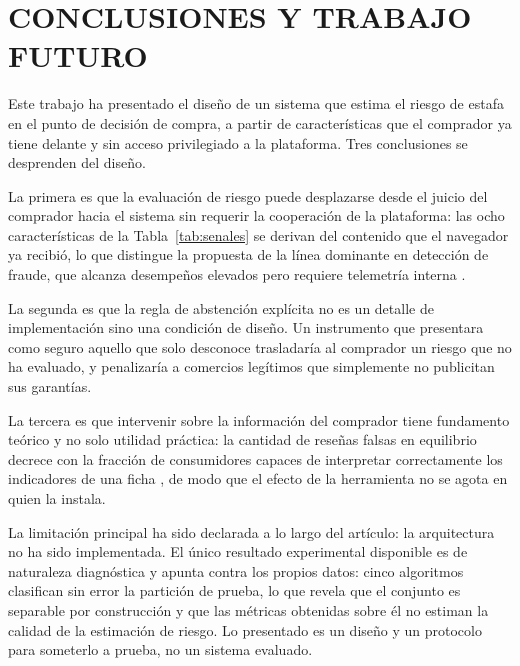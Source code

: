 
\section{CONCLUSIONES Y TRABAJO FUTURO}

Este trabajo ha presentado el diseño de un sistema que estima el riesgo de estafa en el punto
de decisión de compra, a partir de características que el comprador ya tiene delante y sin acceso
privilegiado a la plataforma. Tres conclusiones se desprenden del diseño.

La primera es que la evaluación de riesgo puede desplazarse desde el juicio del comprador
hacia el sistema sin requerir la cooperación de la plataforma: las ocho características de la
Tabla~\ref{tab:senales} se derivan del contenido que el navegador ya recibió, lo que distingue
la propuesta de la línea dominante en detección de fraude, que alcanza desempeños elevados
pero requiere telemetría interna \cite{ref28}.

La segunda es que la regla de abstención explícita no es un detalle de implementación sino una
condición de diseño. Un instrumento que presentara como seguro aquello que solo desconoce
trasladaría al comprador un riesgo que no ha evaluado, y penalizaría a comercios legítimos que
simplemente no publicitan sus garantías.

La tercera es que intervenir sobre la información del comprador tiene fundamento teórico y no
solo utilidad práctica: la cantidad de reseñas falsas en equilibrio decrece con la fracción de
consumidores capaces de interpretar correctamente los indicadores de una ficha \cite{ref29},
de modo que el efecto de la herramienta no se agota en quien la instala.

La limitación principal ha sido declarada a lo largo del artículo: la arquitectura
no ha sido implementada. El único resultado experimental disponible es de naturaleza
diagnóstica y apunta contra los propios datos: cinco algoritmos clasifican sin error la
partición de prueba, lo que revela que el conjunto es separable por construcción y que las
métricas obtenidas sobre él no estiman la calidad de la estimación de riesgo. Lo presentado es un diseño y un protocolo para
someterlo a prueba, no un sistema evaluado.

